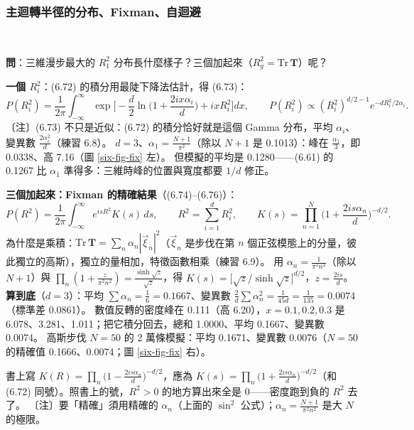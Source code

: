 \subsubsection{主迴轉半徑的分布、Fixman、自迴避}
\leavevmode{}\ \par\nopagebreak

\textbf{問}：三維漫步最大的 $R_1^2$ 分布長什麼樣子？三個加起來（$R_g^2=\mathrm{Tr}\,\mathbf T$）呢？

\textbf{一個 $R_i^2$}：(6.72) 的積分用最陡下降法估計，得 (6.73)：
\[P(R_i^2)=\frac1{2\pi}\int_{-\infty}^{\infty}\exp\Big[-\frac d2\ln\Big(1+\frac{2ix\alpha_i}{d}\Big)+ixR_i^2\Big]dx,\qquad
P(R_i^2)\propto(R_i^2)^{d/2-1}e^{-dR_i^2/2\alpha_i}.\tag{6.72, 6.73}\]
〔注〕(6.73) 不只是近似：(6.72) 的積分恰好就是這個 Gamma 分布，平均 $\alpha_i$、變異數 $\frac{2\alpha_i^2}d$（練習 6.8）。
$d=3$、$\alpha_1=\frac{N+1}{\pi^2}$（除以 $N+1$ 是 0.1013）：峰在 $\frac{\alpha_1}3$，即 0.0338、高 7.16（圖 \ref{six-fig-fix} 左）。
但模擬的平均是 0.1280——(6.61) 的 0.1267 比 $\alpha_1$ 準得多：三維時峰的位置與寬度都要 $1/d$ 修正。

\textbf{三個加起來：Fixman 的精確結果}（(6.74)--(6.76)）：
\[P(R^2)=\frac1{2\pi}\int_{-\infty}^{\infty}e^{isR^2}K(s)\,ds,\qquad R^2=\sum_{i=1}^dR_i^2,\qquad K(s)=\prod_{n=1}^{N}\Big(1+\frac{2is\alpha_n}{d}\Big)^{-d/2}.\]
為什麼是乘積：$\mathrm{Tr}\,\mathbf T=\sum_n\alpha_n|\vec\xi_n|^2$（$\vec\xi_n$ 是步伐在第 $n$ 個正弦模態上的分量，彼此獨立的高斯），獨立的量相加，特徵函數相乘（練習 6.9）。
用 $\alpha_n=\frac{1}{\pi^2n^2}$（除以 $N+1$）與 $\prod_n(1+\frac{z}{\pi^2n^2})=\frac{\sinh\sqrt z}{\sqrt z}$，得 $K(s)=\big[\sqrt z/\sinh\sqrt z\big]^{d/2}$，$z=\frac{2is}{d}$。
\textbf{算到底}（$d=3$）：平均 $\sum\alpha_n=\frac16=0.1667$、變異數 $\frac2d\sum\alpha_n^2=\frac{1}{45d}=\frac1{135}=0.0074$（標準差 0.0861）。
數值反轉的密度峰在 0.111（高 6.20），$x=0.1,0.2,0.3$ 是 6.078、3.281、1.011；把它積分回去，總和 1.0000、平均 0.1667、變異數 0.0074。
高斯步伐 $N=50$ 的 2 萬條模擬：平均 0.1671、變異數 0.0076（$N=50$ 的精確值 0.1666、0.0074；圖 \ref{six-fig-fix} 右）。
\begin{errbox}[p.~153，(6.76)]
書上寫 $K(R)=\prod_n\big(1-\frac{2is\alpha_n}{d}\big)^{-d/2}$，應為 $K(s)=\prod_n\big(1+\frac{2is\alpha_n}{d}\big)^{-d/2}$（和 (6.72) 同號）。照書上的號，$R^2>0$ 的地方算出來全是 0——密度跑到負的 $R^2$ 去了。
〔注〕要「精確」須用精確的 $\alpha_n$（上面的 $\sin^2$ 公式）；$\alpha_n=\frac{N+1}{\pi^2n^2}$ 是大 $N$ 的極限。
\end{errbox}

